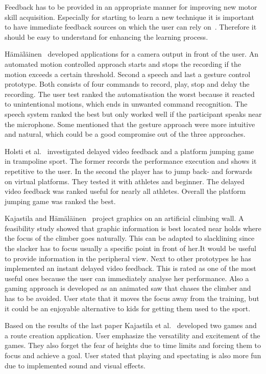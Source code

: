 Feedback has to be provided in an appropriate manner for improving new motor skill acquisition. Especially for starting to learn a new technique it is important to have immediate feedback sources on which the user can rely on~\cite{Hodges2002-gb, Winstein1990-to}. Therefore it should be easy to understand for enhancing the learning process. 

Hämäläinen~\cite{Hmlinen2004-ai} developed applications for a camera output in front of the user. An automated motion controlled approach starts and stops the recording if the motion exceeds a certain threshold. Second a speech and last a gesture control prototype. Both consists of four commands to record, play, stop and delay the recording. The user test ranked the automatisation the worst because it reacted to unintentional motions, which ends in unwanted command recognition. The speech system ranked the best but only worked well if the participant speaks near the microphone. Some mentioned that the gesture approach were more intuitive and natural, which could be a good compromise out of the three approaches.

Holsti et al.~\cite{Holsti2013-kn} investigated delayed video feedback and a platform jumping game in trampoline sport. The former records the performance execution and shows it repetitive to the user. In the second the player has to jump back- and forwards on virtual platforms. They tested it with athletes and beginner. The delayed video feedback was ranked useful for nearly all athletes. Overall the platform jumping game was ranked the best.

Kajastila and Hämäläinen~\cite{Kajastila2014-ug} project graphics on an artificial climbing wall. A feasibility study showed that graphic information is best located near holds where the focus of the climber goes naturally. 
This can be adapted to slacklining since the slacker has to focus usually a specific point in front of her.It would be useful to provide information in the peripheral view. Next to other prototypes he has implemented an instant delayed video feedback. This is rated as one of the most useful ones because the user can immediately analyse her performance. Also a gaming approach is developed as an animated saw that chases the climber and has to be avoided. User state that it moves the focus away from the training, but it could be an enjoyable alternative to kids for getting them used to the sport. 

Based on the results of the last paper Kajastila et al.~\cite{Kajastila2016-ot} developed two games and a route creation application. User emphasize the versatility and excitement of the games. They also forget the fear of heights due to time limits and forcing them to focus and achieve a goal. User stated that playing and spectating is also more fun due to implemented sound and visual effects.

